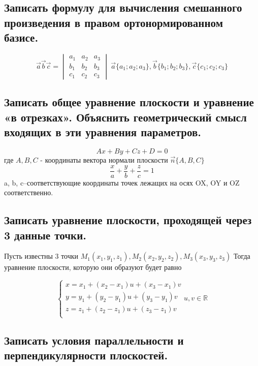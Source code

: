 \documentclass[a4paper, 10pt]{article}
\renewcommand{\a}{\vec{a}}
\renewcommand{\b}{\vec{b}}
\renewcommand{\c}{\vec{c}}
\newcommand{\image}[2]{
	\begin{figure}[H]
		\center{\texttt{[image: img/\#1]} }
    \end{figure}
}
\begin{document}
\subsection{Записать формулу для вычисления смешанного произведения в правом ортонормированном базисе.}

$$\a\b\c = 
\begin{vmatrix}
    a_1 & a_2 & a_3\\
    b_1 & b_2 & b_3\\
    c_1 & c_2 & c_3
\end{vmatrix} \ \a\{a_1;a_2;a_3\},
\b\{b_1;b_2;b_3\}, \c\{c_1;c_2;c_3\}$$

\subsection{Записать общее уравнение плоскости и уравнение «в отрезках». Объяснить 
геометрический смысл входящих в эти уравнения параметров.}

$$Ax + By + Cz + D = 0$$где $A, B, C$ - координаты вектора нормали плоскости $\vec{n}\{A, B, C\}$
$$\frac{x}{a}+\frac{y}{b}+\frac{z}{c} = 1$$a, b, c–соответствующие координаты точек 
лежащих на осях OX, OY и OZ соответственно.

\image{4.png}{200}


\subsection{Записать уравнение плоскости, проходящей через 3 данные точки.}
Пусть известны 3 точки $M_1(x_1,y_1,z_1),M_2(x_2,y_2,z_2),M_3(x_3,y_3,z_3)$
Тогда уравнение плоскости, которую они образуют будет равно 


$$
 \begin{cases}
   x = x_1+(x_2-x_1)u+(x_3-x_1)v\\
   y = y_1+(y_2-y_1)u+(y_3-y_1)v\\
   z = z_1+(z_2-z_1)u+(z_3-z_1)v\\
 \end{cases}
 u,v \in \mathbb{R}
$$

\subsection{Записать условия параллельности и перпендикулярности плоскостей.}
\end{document}
